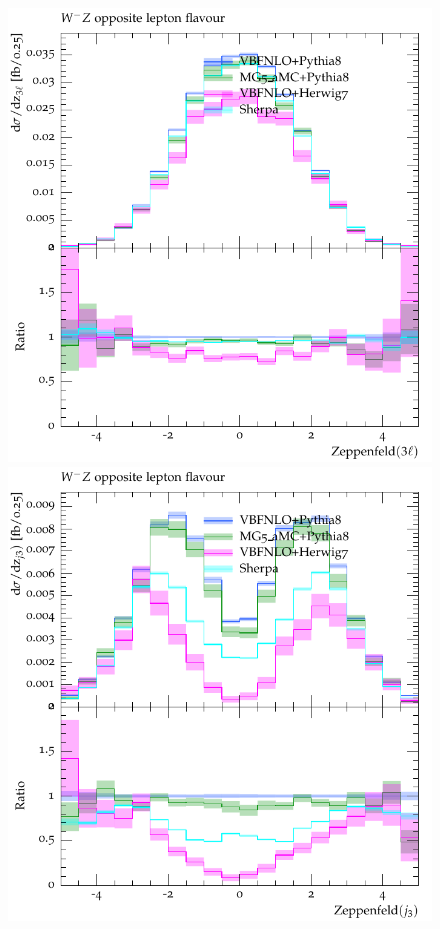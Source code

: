 \begin{figure}[htbp]
\begin{center}
   \includegraphics[scale=0.65]{figs/VBFNLO_WmZ_OF_zep3l}
   \includegraphics[scale=0.65]{figs/VBFNLO_WmZ_OF_zepj3}

\end{center}
\end{figure}
